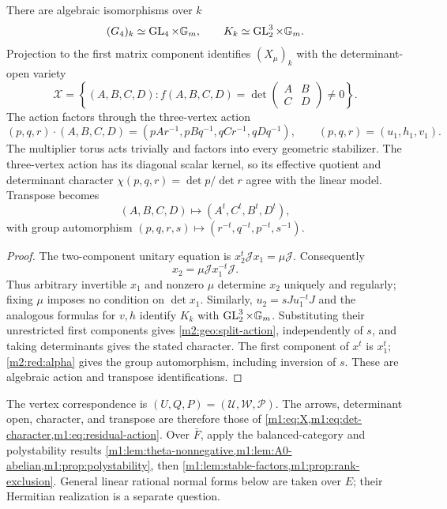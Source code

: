 \begin{proposition}\label{m2:geo:split-bridge}
There are algebraic isomorphisms over $k$
\[
 (G_4)_k\simeq\operatorname{GL}_4\times\mathbb G_m,\qquad
 K_k\simeq\operatorname{GL}_2^3\times\mathbb G_m.
\]
Projection to the first matrix component identifies $(X_\mu)_k$
with the determinant-open variety
\[
 \mathscr X=\left\{(A,B,C,D):
 f(A,B,C,D)=\det\begin{pmatrix}A&B\\C&D\end{pmatrix}\ne0\right\}.
\]
The action factors through the three-vertex action
\begin{equation}\label{m2:geo:split-action}
 (p,q,r)\cdot(A,B,C,D)
 =(pAr^{-1},pBq^{-1},qCr^{-1},qDq^{-1}),
 \qquad(p,q,r)=(u_1,h_1,v_1).
\end{equation}
The multiplier torus acts trivially and factors into every geometric
stabilizer. The three-vertex action has its diagonal scalar kernel,
so its effective quotient and determinant character
$\chi(p,q,r)=\det p/\det r$ agree with the linear model. Transpose becomes
\begin{equation}\label{m2:geo:split-transpose}
 (A,B,C,D)\longmapsto(A^t,C^t,B^t,D^t),
\end{equation}
with group automorphism
$(p,q,r,s)\mapsto(r^{-t},q^{-t},p^{-t},s^{-1})$.
\end{proposition}

\begin{proof}
The two-component unitary equation is
$x_2^t\mathcal Jx_1=\mu\mathcal J$. Consequently
\begin{equation}\label{m2:geo:second-component}
 x_2=\mu\mathcal Jx_1^{-t}\mathcal J.
\end{equation}
Thus arbitrary invertible $x_1$ and nonzero $\mu$ determine $x_2$
uniquely and regularly; fixing $\mu$ imposes no condition on
$\det x_1$. Similarly, $u_2=sJu_1^{-t}J$ and the analogous
formulas for $v,h$ identify $K_k$ with $\operatorname{GL}_2^3\times\mathbb G_m$.
Substituting their unrestricted first components gives
\eqref{m2:geo:split-action}, independently of $s$, and taking determinants
gives the stated character. The first component of $x^t$ is $x_1^t$;
\eqref{m2:red:alpha} gives the group automorphism, including inversion
of $s$. These are algebraic action and transpose identifications.
\end{proof}

The vertex correspondence is $(U,Q,P)=(\mathcal U,\mathcal W,\mathcal P)$.
The arrows, determinant open, character, and transpose are therefore
those of \cref{m1:eq:X,m1:eq:det-character,m1:eq:residual-action}.
Over $\bar F$, apply the balanced-category and polystability results
\cref{m1:lem:theta-nonnegative,m1:lem:A0-abelian,m1:prop:polystability},
then \cref{m1:lem:stable-factors,m1:prop:rank-exclusion}.
General linear rational normal forms below are taken over $E$;
their Hermitian realization is a separate question.

